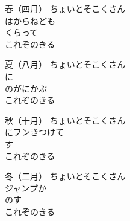 \documentclass[10pt,b5j]{tarticle} %
\begin{document}
\begin{enumerate} %
    \begin{minipage}[c]{\blocksize}

        \vspace{\linespace}
        \item [春（四月）]
        ちょいとそこくさん\\
        はからねども\\
        くらって\\
        これぞのきる
        
        \vspace{\linespace}
        \item [夏（八月）]
        ちょいとそこくさん\\
        に\\
        のがにかぶ\\
        これぞのきる
        
    \end{minipage}
    \begin{minipage}[c]{\blocksize}

        \vspace{\linespace}
        \item [秋（十月）]
        ちょいとそこくさん\\
        にフンきつけて\\
        す\\
        これぞのきる
        
        \vspace{\linespace}
        \item [冬（二月）]
        ちょいとそこくさん\\
        ジャンプか\\
        のす\\
        これぞのきる
        

\end{minipage}
\end{enumerate}
\end{document}

